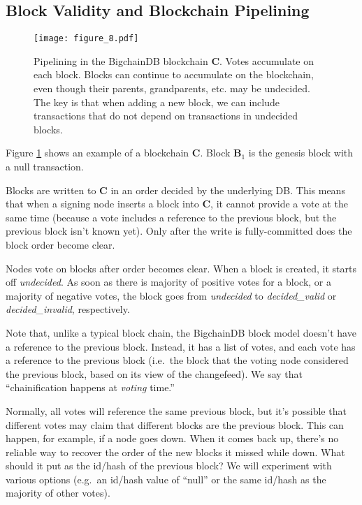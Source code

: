 \subsection{Block Validity and Blockchain Pipelining}

\begin{figure}[!ht]
  \centering
  \texttt{[image: figure\_8.pdf]}
  \caption{Pipelining in the BigchainDB blockchain $\mathbf{C}$.
  Votes accumulate on each block.
  Blocks can continue to accumulate on the blockchain, even though their parents, grandparents, etc. may be undecided.
  The key is that when adding a new block, we can include transactions that do not depend on transactions in undecided blocks.}
  \label{fig:bigchaindb_chain_pipelining}
\end{figure}

Figure \ref{fig:bigchaindb_chain_pipelining} shows an example of a blockchain $\mathbf{C}$.
Block $\mathbf{B}_1$ is the genesis block with a null transaction.

Blocks are written to $\mathbf{C}$ in an order decided by the underlying DB.
This means that when a signing node inserts a block into $\mathbf{C}$, it cannot provide a vote at the same time (because a vote includes a reference to the previous block, but the previous block isn't known yet).
Only after the write is fully-committed does the block order become clear. 

Nodes vote on blocks after order becomes clear.
When a block is created, it starts off \textsf{\textit{undecided}}.
As soon as there is majority of positive votes for a block, or a majority of negative votes, the block goes from \textsf{\textit{undecided}} to \textsf{\textit{decided\_valid}} or \textsf{\textit{decided\_invalid}}, respectively.

Note that, unlike a typical block chain, the BigchainDB block model doesn't have a reference to the previous block.
Instead, it has a list of votes, and each vote has a reference to the previous block (i.e.~the block that the voting node considered the previous block, based on its view of the changefeed). We say that ``chainification happens at \textit{voting} time.''

Normally, all votes will reference the same previous block, but it's possible that different votes may claim that different blocks are the previous block. This can happen, for example, if a node goes down. When it comes back up, there's no reliable way to recover the order of the new blocks it missed while down. What should it put as the id/hash of the previous block? We will experiment with various options (e.g.~an id/hash value of ``null'' or the same id/hash as the majority of other votes).

